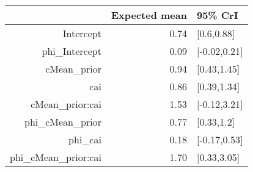 \begin{tabular}{rrl}
  \hline
 & Expected mean & 95\% CrI \\ 
  \hline
Intercept & 0.74 & [0.6,0.88] \\ 
  phi\_Intercept & 0.09 & [-0.02,0.21] \\ 
  cMean\_prior & 0.94 & [0.43,1.45] \\ 
  cai & 0.86 & [0.39,1.34] \\ 
  cMean\_prior:cai & 1.53 & [-0.12,3.21] \\ 
  phi\_cMean\_prior & 0.77 & [0.33,1.2] \\ 
  phi\_cai & 0.18 & [-0.17,0.53] \\ 
  phi\_cMean\_prior:cai & 1.70 & [0.33,3.05] \\ 
   \hline
\end{tabular}

